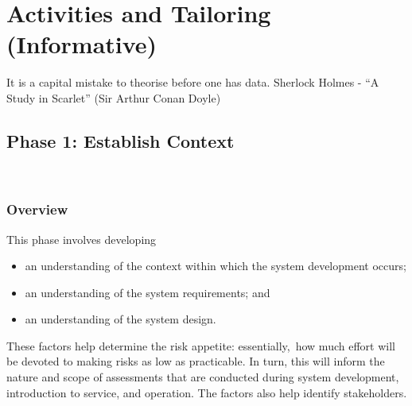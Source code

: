 %
%
\section{Activities and Tailoring (Informative)} \label{bkm:activitiestailoring}

\dsiwgSectionQuote
  {It is a capital mistake to theorise before one has data.}
  {Sherlock Holmes - ``A Study in Scarlet'' (Sir Arthur Conan Doyle)}


\cbstart\subsection{Phase 1: Establish Context}\cbend\
\subsubsection{Overview}
This phase involves developing
\cbstart
\begin{itemize}
	\item an understanding of the context within which the system development occurs; 
	\item an understanding of the system requirements; and 
	\item an understanding of the system design.
\end{itemize}
\cbend

These factors help determine the risk appetite\cbstart: essentially,\cbend\ how much effort will be devoted to making risks as low as practicable. In turn, this will inform the nature and scope of assessments that are conducted during system development, introduction to service, and operation. The factors also help identify \glspl{stakeholder}.


